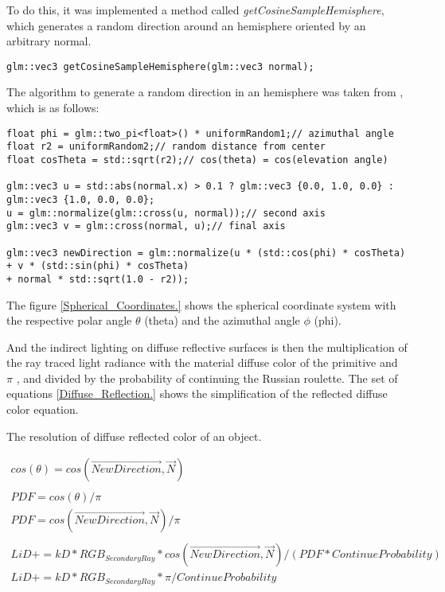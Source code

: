 \par
To do this, it was implemented a method called \textit{getCosineSampleHemisphere}, which generates a random direction around an hemisphere oriented by an arbitrary normal.

\begin{lstlisting}[caption={Method in Shader which generates a random direction in an hemisphere.}, captionpos=b, label=Shader]
glm::vec3 getCosineSampleHemisphere(glm::vec3 normal);
\end{lstlisting}

\par
The algorithm to generate a random direction in an hemisphere was taken from  \cite{CosineSampleHemisphere}, which is as follows:

\begin{lstlisting}[caption={Method in Shader which generates a random direction in an hemisphere.}, captionpos=b, label=Shader]
float phi = glm::two_pi<float>() * uniformRandom1;// azimuthal angle
float r2 = uniformRandom2;// random distance from center
float cosTheta = std::sqrt(r2);// cos(theta) = cos(elevation angle)

glm::vec3 u = std::abs(normal.x) > 0.1 ? glm::vec3 {0.0, 1.0, 0.0} : glm::vec3 {1.0, 0.0, 0.0};
u = glm::normalize(glm::cross(u, normal));// second axis
glm::vec3 v = glm::cross(normal, u);// final axis

glm::vec3 newDirection = glm::normalize(u * (std::cos(phi) * cosTheta) + v * (std::sin(phi) * cosTheta)
+ normal * std::sqrt(1.0 - r2));
\end{lstlisting}

The figure \ref{Spherical_Coordinates.} shows the spherical coordinate system with the respective polar angle
$\theta$
(theta) and the azimuthal angle
$\phi$
(phi).

And the indirect lighting on diffuse reflective surfaces is then the multiplication of the ray traced light radiance with the material diffuse color of the primitive and
$\pi$
, and divided by the probability of continuing the Russian roulette.
The set of equations \ref{Diffuse_Reflection.} shows the simplification of the reflected diffuse color equation.

\begin{MyEquation}[H]
\caption{The resolution of diffuse reflected color of an object.}
\begin{equation}
\begin{gathered}
\label{Diffuse_Reflection.}
cos (\theta) = cos(\overrightarrow{NewDirection}, \overrightarrow{N})\\
\\
PDF = cos(\theta) / \pi\\
PDF = cos(\overrightarrow{NewDirection}, \overrightarrow{N}) / \pi\\
\\
LiD += kD * RGB_{SecondaryRay} * cos (\overrightarrow{NewDirection}, \overrightarrow{N}) / (PDF * ContinueProbability)\\
LiD += kD * RGB_{SecondaryRay} * \pi / ContinueProbability
\end{gathered}
\end{equation}
\end{MyEquation}

